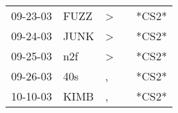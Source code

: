 \begin{supertabular}{lllll}
 09-23-03 &  FUZZ &  \textgreater &   &  *CS2* \\
 09-24-03 &  JUNK &  \textgreater &   &  *CS2* \\
 09-25-03 &   n2f &  \textgreater &   &  *CS2* \\
 09-26-03 &   40s &             , &   &  *CS2* \\
 10-10-03 &  KIMB &             , &   &  *CS2* \\
\end{supertabular}
